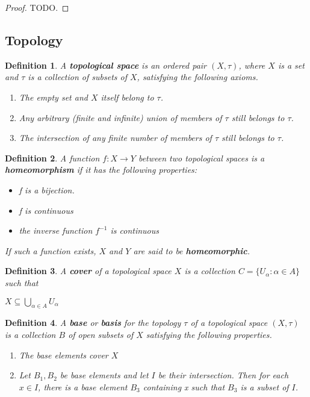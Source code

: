 \documentclass[12pt]{article}
\newcommand\inv[1]{#1^{-1}}
\newcommand\set[1]{\{#1\}}
\newtheorem{defn}{Definition}[thm]
\begin{document}
\begin{proof}
  TODO.
\end{proof}
\subsection{Topology}

\begin{defn}
  A \textbf{topological space} is an ordered pair $(X, \tau)$, where $X$ is a set and $\tau$ is a collection of subsets of $X$, satisfying the following axioms.
  \begin{enumerate}
  \item The empty set and $X$ itself belong to $\tau$.
  \item Any arbitrary (finite and infinite) union of members of $\tau$ still belongs to $\tau$.
  \item The intersection of any finite number of members of $\tau$ still belongs to $\tau$.
  \end{enumerate}
\end{defn}

\begin{defn}
  A function $f: X \to Y$ between two topological spaces is a \textbf{homeomorphism} if it has the following properties:
  \begin{itemize}
  \item f is a bijection.
  \item f is continuous
  \item the inverse function $\inv{f}$ is continuous 
  \end{itemize}
  If such a function exists, $X$ and $Y$ are said to be \textbf{homeomorphic}.
\end{defn}

\begin{defn}
  A \textbf{cover} of a topological space $X$ is a collection $C = \set{U_{\alpha} : \alpha \in A}$ such that
  \begin{center}
    $X \subseteq \bigcup\limits_{\alpha \in A} U_{\alpha}$
  \end{center}
\end{defn}
\begin{defn}
  A \textbf{base} or \textbf{basis} for the topology $\tau$ of a topological space $(X,\tau)$ is a collection $B$ of open subsets of $X$ satisfying the following properties.
  \begin{enumerate}
  \item The base elements cover $X$
  \item Let $B_1, B_2$ be base elements and let $I$ be their intersection. Then for each $x \in I$, there is a base element $B_3$ containing x such that $B_3$ is a subset of $I$.
  \end{enumerate}
\end{defn}
\end{document}
